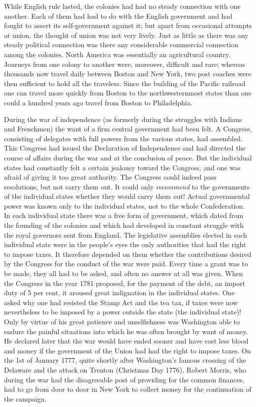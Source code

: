 \documentclass[12pt,a4paper,openany]{book}
\newcommand{\opage}[1]{\marginnote{\footnotesize\textit{[#1]}}}
\begin{document}
While English rule lasted, the
colonies had had no steady connection with one another.
Each of them had had to do with the English
government and had fought to assert its self-government against it;
but apart from occasional attempts at union,
the thought of union was not very lively. Just as little as there was
any steady political connection was there any considerable
commercial connection among the colonies. North America
was essentially an agricultural country. Journeys from one
colony to another were, moreover, difficult and rare;
whereas thousands now travel daily between Boston
and New York, two post coaches were then sufficient to
hold all the travelers. Since the building of the Pacific railroad one
can travel more quickly from Boston to the northwesternmost states
than one could a hundred years ago travel from Boston to
Philadelphia.

\opage{121}During the war of independence (as formerly during the
struggles with Indians and Frenchmen) the want of
a firm central government had been felt. A Congress, consisting of
delegates with full powers from the various states, had
assembled. This Congress had issued the
Declaration of Independence and had directed the course of affairs during the war and at
the conclusion of peace. But the individual states had constantly felt a certain
jealousy toward the Congress, and one was afraid of giving it
too great authority. The Congress could indeed pass resolutions,
but not carry them out. It could only \emph{recommend} to the
governments of the individual states whether they would carry them out! Actual
governmental power was known only to the individual states, not to the whole
Confederation. In each individual state there was a
free form of government, which dated from the founding of the colonies and which had developed in constant struggle with
the royal governors sent from England. The legislative assemblies
elected in each individual state were in the people's
eyes the only authorities that had the right to impose
taxes. It therefore depended on them whether the contributions desired by the Congress
for the conduct of the war were paid. Every
time a grant was to be made, they all had to be asked, and
often no answer at all was given. When the Congress in the year 1781
proposed, for the payment of the debt, an import duty of 5 per cent,
it aroused great indignation in the individual states. One asked
why one had resisted the Stamp Act and the tea tax,
if taxes were now nevertheless to be imposed by a power
outside the state (the individual state)! Only by virtue of his great
patience and unselfishness was Washington able to
endure the painful situations into which he was often brought by want
of money. He declared later that the war would have ended
sooner and have cost less blood and money if the government
of the Union had had the right to impose taxes. On the 1st of January
1777, quite shortly after Washington's famous crossing of the
Delaware and the attack on Trenton (Christmas Day 1776),
Robert Morris, who during the war had the disagreeable
post of providing for the common finances, had to go from door to door in
New York to collect money for the continuation of the campaign.
\end{document}
